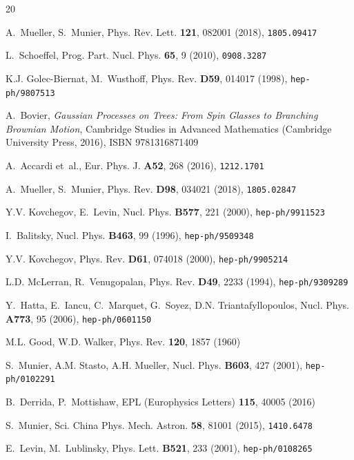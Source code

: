 \documentclass{webofc}
\begin{document}
\begin{thebibliography}{20}

A.~Mueller, S.~Munier, Phys. Rev. Lett. \textbf{121}, 082001 (2018),
  \texttt{1805.09417}

L.~Schoeffel, Prog. Part. Nucl. Phys. \textbf{65}, 9 (2010), \texttt{0908.3287}

K.J. Golec-Biernat, M.~Wusthoff, Phys. Rev. \textbf{D59}, 014017 (1998),
  \texttt{hep-ph/9807513}

A.~Bovier, \emph{Gaussian Processes on Trees: From Spin Glasses to Branching
  Brownian Motion}, Cambridge Studies in Advanced Mathematics (Cambridge
  University Press, 2016), ISBN 9781316871409

A.~Accardi et~al., Eur. Phys. J. \textbf{A52}, 268 (2016), \texttt{1212.1701}

A.~Mueller, S.~Munier, Phys. Rev. \textbf{D98}, 034021 (2018),
  \texttt{1805.02847}

Y.V. Kovchegov, E.~Levin, Nucl. Phys. \textbf{B577}, 221 (2000),
  \texttt{hep-ph/9911523}

I.~Balitsky, Nucl. Phys. \textbf{B463}, 99 (1996), \texttt{hep-ph/9509348}

Y.V. Kovchegov, Phys. Rev. \textbf{D61}, 074018 (2000), \texttt{hep-ph/9905214}

L.D. McLerran, R.~Venugopalan, Phys. Rev. \textbf{D49}, 2233 (1994),
  \texttt{hep-ph/9309289}

Y.~Hatta, E.~Iancu, C.~Marquet, G.~Soyez, D.N. Triantafyllopoulos, Nucl. Phys.
  \textbf{A773}, 95 (2006), \texttt{hep-ph/0601150}

M.L. Good, W.D. Walker, Phys. Rev. \textbf{120}, 1857 (1960)

S.~Munier, A.M. Stasto, A.H. Mueller, Nucl. Phys. \textbf{B603}, 427 (2001),
  \texttt{hep-ph/0102291}

B.~Derrida, P.~Mottishaw, EPL (Europhysics Letters) \textbf{115}, 40005 (2016)

S.~Munier, Sci. China Phys. Mech. Astron. \textbf{58}, 81001 (2015),
  \texttt{1410.6478}

E.~Levin, M.~Lublinsky, Phys. Lett. \textbf{B521}, 233 (2001),
  \texttt{hep-ph/0108265}


\end{thebibliography}
\end{document}

